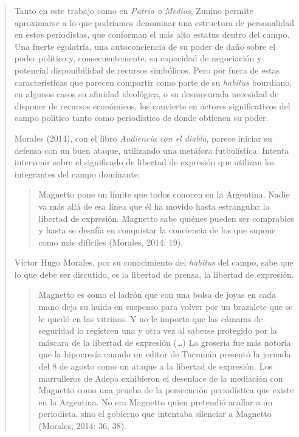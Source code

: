 \begin{quote}
Tanto en este trabajo como en \emph{Patria o Medios}, Zunino permite aproximarse a lo que podríamos denominar una estructura de personalidad en estos periodistas, que conforman el más alto estatus dentro del campo. Una fuerte egolatría, una autoconciencia de su poder de daño sobre el poder político y, consecuentemente, su capacidad de negociación y potencial disponibilidad de recursos simbólicos. Pero por fuera de estas características que parecen compartir como parte de su \emph{habitus} bourdiano, en algunos casos su afinidad ideológica, o su desmesurada necesidad de disponer de recursos económicos, los convierte en actores significativos del campo político tanto como periodístico de donde obtienen su poder.

Morales (2014), con el libro \emph{Audiencia con el diablo}, parece iniciar su defensa con un buen ataque, utilizando una metáfora futbolística. Intenta intervenir sobre el significado de libertad de expresión que utilizan los integrantes del campo dominante:

\begin{quote}
	Magnetto pone un límite que todos conocen en la Argentina. Nadie va más allá de esa línea que él ha movido hasta estrangular la libertad de expresión. Magnetto sabe quiénes pueden ser comprables y hasta se desafía en conquistar la conciencia de los que supone como más difíciles (Morales, 2014: 19).
\end{quote}


Víctor Hugo Morales, por su conocimiento del \emph{habitus} del campo, sabe que lo que debe ser discutido, es la libertad de prensa, la libertad de expresión.

\begin{quote}
	Magnetto es como el ladrón que con una bolsa de joyas en cada mano deja su huida en suspenso para volver por un brazalete que se le quedó en las vitrinas. Y no le importa que las cámaras de seguridad lo registren una y otra vez al saberse protegido por la máscara de la libertad de expresión (\dots) La grosería fue más notoria que la hipocresía cuando un editor de Tucumán presentó la jornada del 8 de agosto como un ataque a la libertad de expresión. Los marrulleros de Adepa exhibieron el desenlace de la mediación con Magnetto como una prueba de la persecución periodística que existe en la Argentina. No era Magnetto quien pretendió acallar a un periodista, sino el gobierno que intentaba silenciar a Magnetto (Morales, 2014: 36, 38).
\end{quote}



\end{quote}
